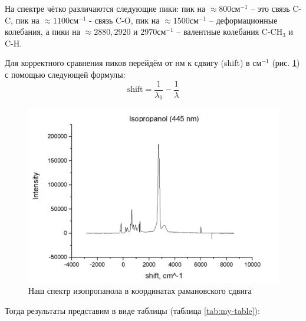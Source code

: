 \documentclass{article}
\begin{document}
\newpage
\par На спектре чётко различаются следующие пики: пик на
$ \approx 800 \text{см}^{-1}$ – это связь C-C, пик на $ \approx 1100 \text{см}^{-1}$
- связь C-O, пик на $ \approx 1500 \text{см}^{-1}$ – деформационные колебания, а пики на $ \approx 2880 , 2920 \text{ и } 2970 \text{см}^{-1}$ – валентные колебания $\text{C-CH}_3$ и C-H.
\par Для корректного сравнения пиков перейдём от нм к сдвигу (shift) в $\text{см}^{-1}$ (рис. \ref{shift}) с помощью следующей формулы:
$$\text{shift} = \frac{1}{\lambda _0} - \frac{1}{\lambda}$$
\begin{figure}[h!]
\centering
    \includegraphics[width=0.8\linewidth]{Images/iso 445 shift.png}
    \caption{Наш спектр изопропанола в координатах рамановского сдвига}
    \label{shift}
\end{figure}
\par Тогда результаты представим в виде таблицы (таблица \ref{tab:my-table}):
\end{document}
